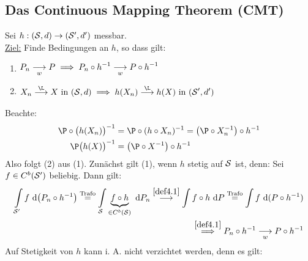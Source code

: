 \subsection*{Das Continuous Mapping Theorem (CMT)}
Sei $h:(\S,d)\to(\S',d')$ messbar.\\
\underline{Ziel:} Finde Bedingungen an $h$, so dass gilt:
\begin{enumerate}[label=(\arabic*)]
	\item $\begin{aligned}
		P_n\stackrelnew{w}{}{\longrightarrow}P\implies P_n\circ h^{-1}\stackrelnew{w}{}{\longrightarrow} P\circ h^{-1}
	\end{aligned}$
	\item $\begin{aligned}
		X_n\stackrel{\L}{\longrightarrow} X\text{ in }(\S,d)\implies h(X_n)\stackrel{\L}{\longrightarrow} h(X)\text{ in }(\S',d')
	\end{aligned}$
\end{enumerate}
Beachte: 
\begin{align*}
	\P\circ\big(h(X_n)\big)^{-1}&=\P\circ(h\circ X_n)^{-1}=\big(\P\circ X_n^{-1}\big)\circ h^{-1}\\
	\P\big(h(X)\big)^{-1}&=\big(\P\circ X^{-1}\big)\circ h^{-1}
\end{align*}
Also folgt (2) aus (1). Zunächst gilt (1), wenn $h$ stetig auf $\S$  ist, denn: Sei $f\in C^b(\S')$ beliebig. Dann gilt:
\begin{align*}
	\int\limits_{\S'} f\d \big(P_n\circ h^{-1}\big)
	\stackeq{\text{Trafo}}
	\int\limits_{\S} \underbrace{ f\circ h}_{\in C^b(\S)}\d P_n
	\stackrel{\ref{def4.1}}{\longrightarrow}\int\limits f\circ h\d P
	\stackeq{\text{Trafo}}
	\int\limits f\d(P\circ h^{-1})\\
	\stackrel{\ref{def4.1}}{\implies}
	P_n\circ h^{-1}\stackrelnew{w}{}{\longrightarrow} P\circ h^{-1}
\end{align*}
Auf Stetigkeit von $h$ kann i. A. nicht verzichtet werden, denn es gilt:

